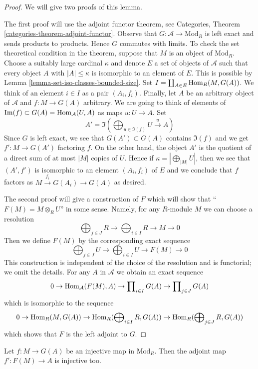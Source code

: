 \begin{proof}
We will give two proofs of this lemma.

\medskip\noindent
The first proof will use the adjoint functor theorem, see
Categories, Theorem \ref{categories-theorem-adjoint-functor}.
Observe that $G : \mathcal{A} \to \text{Mod}_R$ is left exact and sends
products to products. Hence $G$ commutes with limits. To check the set
theoretical condition in the theorem, suppose that $M$ is an object of
$\text{Mod}_R$. Choose a suitably large cardinal $\kappa$ and denote $E$
a set of objects of $\mathcal{A}$ such that every object $A$ with
$|A| \leq \kappa$ is isomorphic to an element of $E$. This is possible
by Lemma \ref{lemma-set-iso-classes-bounded-size}. Set
$I = \coprod_{A \in E} \mathop{\mathrm{Hom}}\nolimits_R(M, G(A))$.
We think of an element $i \in I$ as a pair $(A_i, f_i)$.
Finally, let $A$ be an arbitrary object of $\mathcal{A}$
and $f : M \to G(A)$ arbitrary. We are going to think of
elements of $\mathop{\mathrm{Im}}(f) \subset G(A) = \mathop{\mathrm{Hom}}\nolimits_\mathcal{A}(U, A)$
as maps $u : U \to A$. Set
$$
A' = \Im(\bigoplus\nolimits_{u \in \Im(f)} U \xrightarrow{u} A)
$$
Since $G$ is left exact, we see that $G(A') \subset G(A)$
contains $\Im(f)$ and we get $f' : M \to G(A')$ factoring $f$.
On the other hand, the object $A'$ is
the quotient of a direct sum of at most $|M|$ copies of $U$.
Hence if $\kappa = |\bigoplus_{|M|} U|$, then we see that $(A', f')$
is isomorphic to an element $(A_i, f_i)$ of $E$ and we conclude that $f$
factors as $M \xrightarrow{f_i} G(A_i) \to G(A)$ as desired.

\medskip\noindent
The second proof will give a construction of $F$ which will show
that ``$F(M) = M \otimes_R U$'' in some sense. Namely, for any
$R$-module $M$ we can choose a resolution
$$
\bigoplus\nolimits_{j \in J} R \to
\bigoplus\nolimits_{i \in I} R \to
M \to 0
$$
Then we define $F(M)$ by the corresponding exact sequence
$$
\bigoplus\nolimits_{j \in J} U \to
\bigoplus\nolimits_{i \in I} U \to
F(M) \to 0
$$
This construction is independent of the choice of the resolution
and is functorial; we omit the details.
For any $A$ in $\mathcal{A}$ we obtain an exact sequence
$$
0 \to \mathop{\mathrm{Hom}}\nolimits_\mathcal{A}(F(M), A) \to
\prod\nolimits_{i \in I} G(A) \to
\prod\nolimits_{j \in J} G(A)
$$
which is isomorphic to the sequence
$$
0 \to \mathop{\mathrm{Hom}}\nolimits_R(M, G(A)) \to
\mathop{\mathrm{Hom}}\nolimits_R(\bigoplus\nolimits_{i \in I} R, G(A)) \to
\mathop{\mathrm{Hom}}\nolimits_R(\bigoplus\nolimits_{j \in J} R, G(A))
$$
which shows that $F$ is the left adjoint to $G$.
\end{proof}

\begin{lemma}
\label{lemma-F-G-monos}
Let $f : M \to G(A)$ be an injective map in $\text{Mod}_R$.
Then the adjoint map $f' : F(M) \to A$ is injective too.
\end{lemma}

